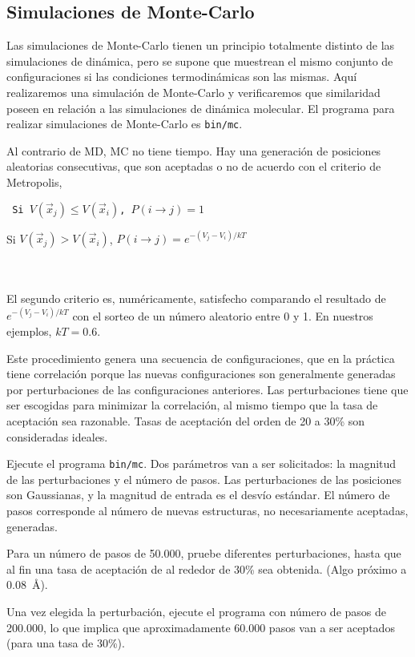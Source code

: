 \documentclass[10pt,a4paper,ssfamily]{exam}
\newcommand{\1}{{\bf 1}}
\newcommand{\2}{{\bf 2}}
\newcommand{\3}{{\bf 3}}
\begin{document}
\subsection{Simulaciones de Monte-Carlo}

Las simulaciones de Monte-Carlo tienen un principio totalmente distinto
de las simulaciones de dinámica, pero se supone que muestrean el mismo
conjunto de configuraciones si las condiciones termodinámicas son las
mismas. Aquí realizaremos una simulación de Monte-Carlo y verificaremos
que similaridad poseen en relación a las simulaciones de dinámica
molecular. El programa para realizar simulaciones de Monte-Carlo es 
{\tt bin/mc}.

Al contrario de MD, MC no tiene tiempo. Hay una generación de posiciones
aleatorias consecutivas, que son aceptadas o no de acuerdo con el
criterio de Metropolis,\\

{\tt 
\hspace{3cm} Si $V(\vec{x}_j) \leqslant V(\vec{x}_i)$, $P(i\to j) = 1$ 

\hspace{3cm} Si $V(\vec{x}_j) > V(\vec{x}_i)$, $P(i\to j) = e^{-(V_j-V_i)/kT}$
}\\\\
El segundo criterio es, numéricamente, satisfecho comparando el
resultado de $e^{-(V_j-V_i)/kT}$ con el sorteo de un número aleatorio
entre 0 y 1. En nuestros ejemplos, $kT=0.6$.

Este procedimiento genera una secuencia de configuraciones, que en la
práctica tiene correlación porque las nuevas configuraciones son
generalmente generadas por perturbaciones de las configuraciones
anteriores. Las perturbaciones tiene que ser escogidas para minimizar la
correlación, al mismo tiempo que la tasa de aceptación sea razonable.
Tasas de aceptación del orden de 20 a 30\% son consideradas ideales. 

Ejecute el programa {\tt bin/mc}. Dos parámetros van a ser solicitados:
la magnitud de las perturbaciones y el número de pasos. Las
perturbaciones de las posiciones son Gaussianas, y la magnitud de
entrada es el desvío estándar. El número de pasos corresponde al número
de nuevas estructuras, no necesariamente aceptadas, generadas.  

Para un número de pasos de 50.000, pruebe diferentes perturbaciones,
hasta que al fin una tasa de aceptación de al rededor de 30\% sea
obtenida. (Algo próximo a $0.08$~\AA). 

Una vez elegida la perturbación, ejecute el programa con número de pasos
de 200.000, lo que implica que aproximadamente 60.000 pasos van a ser
aceptados (para una tasa de 30\%). 
\end{document}

